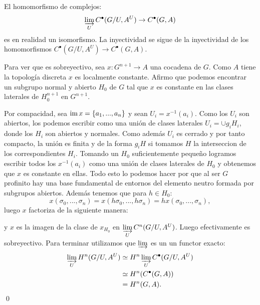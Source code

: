 \documentclass[a4paper,12pt, leqno]{article}
\begin{document}
\begin{dem}
El homomorfismo de complejos:
\begin{equation*}
\varinjlim\limits_{U} C^{\bullet}(G/U,A^U) \rightarrow C^{\bullet}(G,A)
\end{equation*}
es en realidad un isomorfismo. La inyectividad se sigue de la inyectividad de los homomorfismos $C^{\bullet}(G/U,A^U)\rightarrow C^{\bullet}(G,A)$. 

Para ver que es sobreyectivo, sea $x:G^{n+1}\rightarrow A$ una cocadena de $G$.  Como $A$ tiene la topología discreta $x$ es localmente constante. Afirmo que podemos encontrar un subgrupo normal y abierto $H_0$ de $G$ tal que $x$ es constante en las clases laterales de $H_0^{n+1}$ en $G^{n+1}$.

Por compacidad, sea $\mathrm{im}\, x = \{a_1,...,a_n\}$ y sean $U_i=x^{-1}(a_i)$. Como los $U_i$ son abiertos, los podemos escribir como una unión de clases laterales $U_i = \cup g_i H_i$, donde los $H_i$ son abiertos y normales. Como además $U_i$ es cerrado y por tanto compacto, la unión es finita y de la forma $g_i H$ si tomamos $H$ la interseccion de los correspondientes $H_i$. Tomando un $H_0$ suficientemente pequeño logramos escribir todos los $x^{-1}(a_i)$ como una unión de clases laterales de $H_0$ y obtenemos que $x$ es constante en ellas. Todo esto lo podemos hacer por que al ser $G$ profinito hay una base fundamental de entornos del elemento neutro formada por subgrupos abiertos. Además tenemos que para $h \in H_0$:
\begin{equation*}
x(\sigma_0,...,\sigma_n)=x(h \sigma_0,...,h \sigma_n)=h x(\sigma_0,...,\sigma_n),
\end{equation*}
luego $x$ factoriza de la siguiente manera:
\begin{center}
\end{center}
y $x$ es la imagen de la clase de $x_{H_0}$ en $\varinjlim\limits_{U} C^n(G/U,A^U)$. Luego efectivamente es sobreyectivo. Para terminar utilizamos que $\varinjlim$ es un un functor exacto:
\begin{align*}
\varinjlim\limits_{U} H^n(G/U,A^U)& \simeq H^n\varinjlim\limits_{U} C^{\bullet}(G/U,A^U)\\
&\simeq H^n(C^{\bullet}(G,A))\\
&= H^n(G,A).
\end{align*}\qed

\end{dem}
\end{document}

